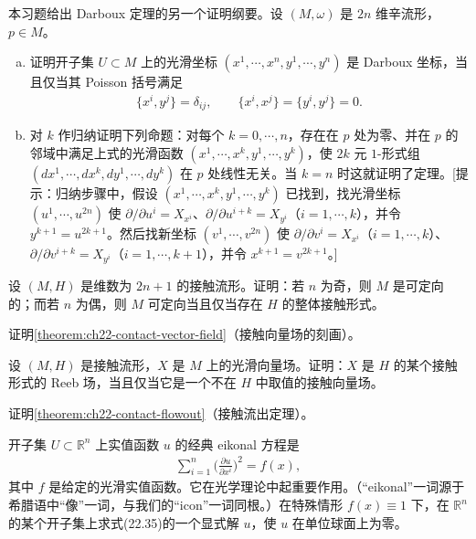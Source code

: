 \documentclass[../../main.tex]{subfiles}
\begin{document}
\begin{exercise}\label{exercise:ch22-p22-19}
本习题给出 Darboux 定理的另一个证明纲要。设 $(M,\omega)$ 是 $2n$ 维辛流形，$p\in M$。
\begin{enumerate}[(a)]
\item 证明开子集 $U\subset M$ 上的光滑坐标 $(x^1,\cdots ,x^n,y^1,\cdots ,y^n)$ 是 Darboux 坐标，当且仅当其 Poisson 括号满足
\begin{align}
\{x^i,y^j\}=\delta_{ij},\qquad \{x^i,x^j\}=\{y^i,y^j\}=0.
\end{align}
\item 对 $k$ 作归纳证明下列命题：对每个 $k=0,\cdots ,n$，存在在 $p$ 处为零、并在 $p$ 的邻域中满足上式的光滑函数 $(x^1,\cdots ,x^k,y^1,\cdots ,y^k)$，使 $2k$ 元 $1$-形式组 $(dx^1,\cdots ,dx^k,dy^1,\cdots ,dy^k)$ 在 $p$ 处线性无关。当 $k=n$ 时这就证明了定理。[提示：归纳步骤中，假设 $(x^1,\cdots ,x^k,y^1,\cdots ,y^k)$ 已找到，找光滑坐标 $(u^1,\cdots ,u^{2n})$ 使 $\partial/\partial u^i=X_{x^i}$、$\partial/\partial u^{i+k}=X_{y^i}$（$i=1,\cdots ,k$），并令 $y^{k+1}=u^{2k+1}$。然后找新坐标 $(v^1,\cdots ,v^{2n})$ 使 $\partial/\partial v^i=X_{x^i}$（$i=1,\cdots ,k$）、$\partial/\partial v^{i+k}=X_{y^i}$（$i=1,\cdots ,k+1$），并令 $x^{k+1}=v^{2k+1}$。]
\end{enumerate}
\end{exercise}

\begin{exercise}\label{exercise:ch22-p22-20}
设 $(M,H)$ 是维数为 $2n+1$ 的接触流形。证明：若 $n$ 为奇，则 $M$ 是可定向的；而若 $n$ 为偶，则 $M$ 可定向当且仅当存在 $H$ 的整体接触形式。
\end{exercise}

\begin{exercise}\label{exercise:ch22-p22-21}
证明\cref{theorem:ch22-contact-vector-field}（接触向量场的刻画）。
\end{exercise}

\begin{exercise}\label{exercise:ch22-p22-22}
设 $(M,H)$ 是接触流形，$X$ 是 $M$ 上的光滑向量场。证明：$X$ 是 $H$ 的某个接触形式的 Reeb 场，当且仅当它是一个不在 $H$ 中取值的接触向量场。
\end{exercise}

\begin{exercise}\label{exercise:ch22-p22-23}
证明\cref{theorem:ch22-contact-flowout}（接触流出定理）。
\end{exercise}

\begin{exercise}\label{exercise:ch22-p22-24}
开子集 $U\subset\mathbb R^n$ 上实值函数 $u$ 的经典 eikonal 方程是
\begin{align}
\sum_{i=1}^n\big(\tfrac{\partial u}{\partial x^i}\big)^2=f(x),
\end{align}
其中 $f$ 是给定的光滑实值函数。它在光学理论中起重要作用。（“eikonal”一词源于希腊语中“像”一词，与我们的“icon”一词同根。）在特殊情形 $f(x)\equiv1$ 下，在 $\mathbb R^n$ 的某个开子集上求式(22.35)的一个显式解 $u$，使 $u$ 在单位球面上为零。
\end{exercise}
\end{document}
